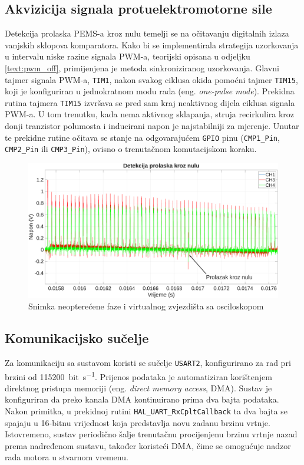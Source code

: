\documentclass[diplomskirad]{fer}
\begin{document}
\subsection{Akvizicija signala protuelektromotorne sile}
\label{ssec:akvizicija_pems}

Detekcija prolaska PEMS-a kroz nulu temelji se na očitavanju digitalnih izlaza
vanjskih sklopova komparatora. Kako bi se implementirala strategija uzorkovanja
u intervalu niske razine signala PWM-a, teorijski opisana u odjeljku
\ref{text:pwm_off}, primijenjena je metoda sinkroniziranog uzorkovanja. Glavni
tajmer signala PWM-a, \texttt{TIM1}, nakon svakog ciklusa okida pomoćni tajmer
\texttt{TIM15}, koji je konfiguriran u jednokratnom modu rada (eng.
\textit{one-pulse mode}). Prekidna rutina tajmera \texttt{TIM15} izvršava se
pred sam kraj neaktivnog dijela ciklusa signala PWM-a. U tom trenutku, kada
nema aktivnog sklapanja, struja recirkulira kroz donji tranzistor polumosta i
inducirani napon je najstabilniji za mjerenje. Unutar te prekidne rutine
očitava se stanje na odgovarajućem \texttt{GPIO} pinu (\texttt{CMP1\_Pin},
\texttt{CMP2\_Pin} ili \texttt{CMP3\_Pin}), ovisno o trenutačnom komutacijskom
koraku.

\begin{figure}[h!]
	\centering
	\includegraphics[width=\textwidth]{csv/zc.pdf}
	\caption{Snimka neopterećene faze i virtualnog zvjezdišta sa osciloskopom}
	\label{fig:zc}
\end{figure}

\subsection{Komunikacijsko sučelje}
\label{ssec:komunikacija}

Za komunikaciju sa sustavom koristi se sučelje \texttt{USART2}, konfigurirano
za rad pri brzini od \SI{115200}{bit\per\second}. Prijenos podataka je
automatiziran korištenjem direktnog pristupa memoriji (eng. \textit{direct
	memory access}, DMA). Sustav je konfiguriran da preko kanala DMA kontinuirano
prima dva bajta podataka. Nakon primitka, u prekidnoj rutini
\texttt{HAL\_UART\_RxCpltCallback} ta dva bajta se spajaju u 16-bitnu
vrijednost koja predstavlja novu zadanu brzinu vrtnje. Istovremeno, sustav
periodično šalje trenutačnu procijenjenu brzinu vrtnje nazad prema nadređenom
sustavu, također koristeći DMA, čime se omogućuje nadzor rada motora u stvarnom
vremenu.
\end{document}
